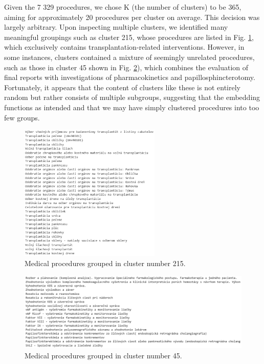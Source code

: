 Given the 7 329 procedures, we chose K (the number of clusters) to be 365, aiming for approximately 20 procedures per cluster on average. This decision was largely arbitrary. Upon inspecting multiple clusters, we identified many meaningful groupings such as cluster 215, whose procedures are listed in Fig. \ref{fig:G215}, which exclusively contains transplantation-related interventions. However, in some instances, clusters contained a mixture of seemingly unrelated procedures, such as those in cluster 45 shown in Fig. \ref{fig:G45}), which combines the evaluation of final reports with investigations of pharmacokinetics and papillosphincterotomy. Fortunately, it appears that the content of clusters like these is not entirely random but rather consists of multiple subgroups, suggesting that the embedding functions as intended and that we may have simply clustered procedures into too few groups.

\begin{figure}[!h]
	\centering
	
	\includegraphics[width=0.6\textwidth]{images/G215.png}
	
	\caption{Medical procedures grouped in cluster number 215.}
	\label{fig:G215}
\end{figure}

\begin{figure}[!h]
	\centering
	
	\includegraphics[width=1.1\textwidth]{images/G45.png}
	
	\caption{Medical procedures grouped in cluster number 45.}
	\label{fig:G45}
\end{figure}